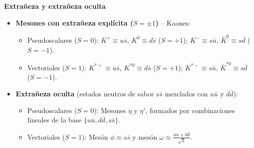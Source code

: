 \textbf{Extrañeza y extrañeza oculta}
\begin{itemize}
    \item \textbf{Mesones con extrañeza explícita ($S = \pm 1$)} -- Kaones:
    \begin{itemize}
        \item Pseudoscalares ($S = 0$): $K^+ \equiv u\bar{s}$, $K^0 \equiv d\bar{s}$ ($S = +1$); $K^- \equiv s\bar{u}$, $\bar{K}^0 \equiv s\bar{d}$ ($S = -1$).
        \item Vectoriales ($S = 1$): $K^{*+} \equiv u\bar{s}$, $K^{*0} \equiv d\bar{s}$ ($S = +1$); $K^{*-} \equiv s\bar{u}$, $\bar{K}^{*0} \equiv s\bar{d}$ ($S = -1$).
    \end{itemize}
    \item \textbf{Extrañeza oculta} (estados neutros de sabor $s\bar{s}$ mezclados con $u\bar{u}$ y $d\bar{d}$):
    \begin{itemize}
        \item Pseudoscalares ($S = 0$): Mesones $\eta$ y $\eta'$, formados por combinaciones lineales de la base $\{u\bar{u}, d\bar{d}, s\bar{s}\}$.
        \item Vectoriales ($S = 1$): Mesón $\phi \approx s\bar{s}$ y mesón $\omega \approx \frac{u\bar{u} + d\bar{d}}{\sqrt{2}}$.
    \end{itemize}
\end{itemize}

